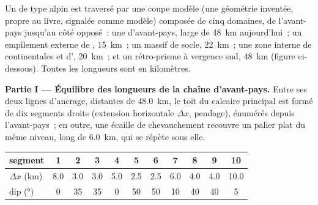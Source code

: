 \begin{problem}\label{pb:b2:alpine-orogen:1}
Un  de type alpin est traversé par une coupe modèle (une géométrie inventée, propre au livre,
signalée comme modèle) composée de cinq domaines, de l'avant-pays jusqu'au côté opposé~:
une  d'avant-pays, large de \qty{48}{km} aujourd'hui~; un empilement externe de , \qty{15}{km}~;
un massif de socle, \qty{22}{km}~; une zone interne de  continentales et d',
\qty{20}{km}~; et un rétro-prisme à vergence sud, \qty{48}{km}
(figure ci-dessous). Toutes les longueurs sont en kilomètres.

\begin{omfigure}
\centering
{}
\par{}
\end{omfigure}

\noindent\textbf{Partie I --- Équilibre des longueurs de la chaîne d'avant-pays.} Entre ses deux lignes
d'ancrage, distantes de \qty{48.0}{km}, le toit du calcaire principal est formé de dix segments droits
(extension horizontale $\Delta x$, pendage), énumérés depuis l'avant-pays~; en outre, une écaille de chevauchement
recouvre un palier plat du même niveau, long de \qty{6.0}{km}, qui se répète sous elle.

\smallskip
\begin{center}\small
\begin{tabular}{l|cccccccccc}
segment & 1 & 2 & 3 & 4 & 5 & 6 & 7 & 8 & 9 & 10\\ \hline
$\Delta x$ (\unit{km}) & 8.0 & 3.0 & 3.0 & 5.0 & 2.5 & 2.5 & 6.0 & 4.0 & 4.0 & 10.0\\
dip (\unit{\degree}) & 0 & 35 & 35 & 0 & 50 & 50 & 10 & 40 & 40 & 5
\end{tabular}
\end{center}
\smallskip


\end{problem}
